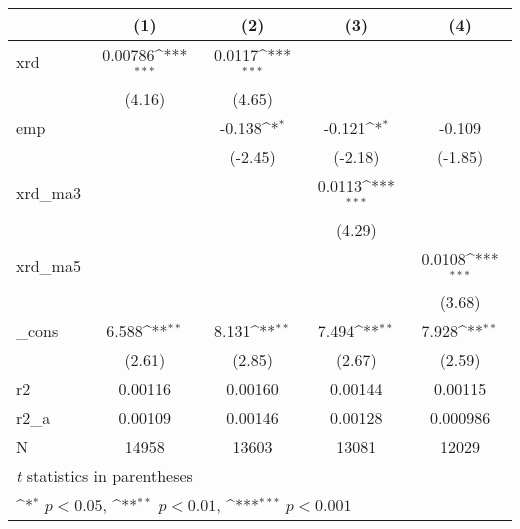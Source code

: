 {
\def\sym#1{\ifmmode^{#1}\else\(^{#1}\)\fi}
\begin{tabular}{l*{4}{c}}
\hline\hline
            &\multicolumn{1}{c}{(1)}         &\multicolumn{1}{c}{(2)}         &\multicolumn{1}{c}{(3)}         &\multicolumn{1}{c}{(4)}         \\
\hline
xrd         &     0.00786\sym{***}&      0.0117\sym{***}&                     &                     \\
            &      (4.16)         &      (4.65)         &                     &                     \\
[1em]
emp         &                     &      -0.138\sym{*}  &      -0.121\sym{*}  &      -0.109         \\
            &                     &     (-2.45)         &     (-2.18)         &     (-1.85)         \\
[1em]
xrd\_ma3     &                     &                     &      0.0113\sym{***}&                     \\
            &                     &                     &      (4.29)         &                     \\
[1em]
xrd\_ma5     &                     &                     &                     &      0.0108\sym{***}\\
            &                     &                     &                     &      (3.68)         \\
[1em]
\_cons      &       6.588\sym{**} &       8.131\sym{**} &       7.494\sym{**} &       7.928\sym{**} \\
            &      (2.61)         &      (2.85)         &      (2.67)         &      (2.59)         \\
\hline
r2          &     0.00116         &     0.00160         &     0.00144         &     0.00115         \\
r2\_a        &     0.00109         &     0.00146         &     0.00128         &    0.000986         \\
N           &       14958         &       13603         &       13081         &       12029         \\
\hline\hline
\multicolumn{5}{l}{\footnotesize \textit{t} statistics in parentheses}\\
\multicolumn{5}{l}{\footnotesize \sym{*} \(p<0.05\), \sym{**} \(p<0.01\), \sym{***} \(p<0.001\)}\\
\end{tabular}
}
